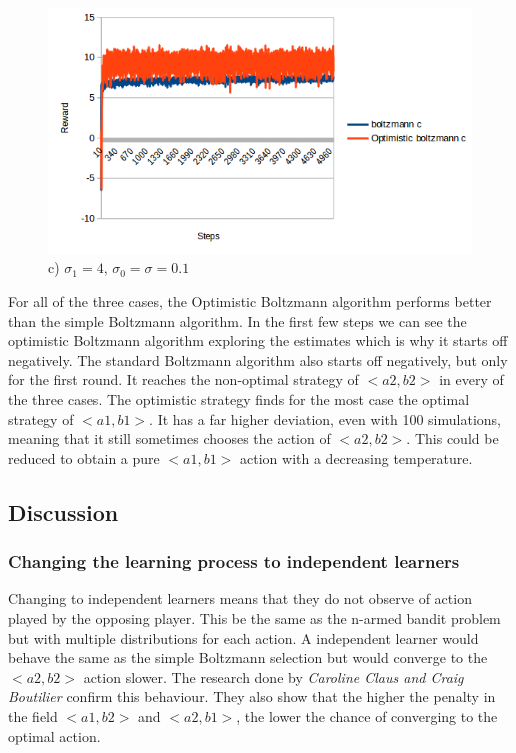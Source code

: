 \documentclass[a4paper, 11pt]{article}
\begin{document}
\begin{figure}[H]
	\centering
	\caption{c) $\sigma_1 = 4$, $\sigma_0 = \sigma = 0.1$}
    \includegraphics[width=1\linewidth]{ex2_c}
\end{figure}

For all of the three cases, the Optimistic Boltzmann algorithm performs better than the simple Boltzmann algorithm. In the first few steps we can see the optimistic Boltzmann algorithm exploring the estimates which is why it starts off negatively. The standard Boltzmann algorithm also starts off negatively, but only for the first round. It reaches the non-optimal strategy of $<a2,b2>$ in every of the three cases. The optimistic strategy finds for the most case the optimal strategy of $<a1,b1>$. It has a far higher deviation, even with 100 simulations, meaning that it still sometimes chooses the action of $<a2,b2>$. This could be reduced to obtain a pure $<a1,b1>$ action with a decreasing temperature.


\subsection{Discussion}

\subsubsection{Changing the learning process to independent learners}

Changing to independent learners means that they do not observe of action played by the opposing player. This be the same as the n-armed bandit problem but with multiple distributions for each action. A independent learner would behave the same as the simple Boltzmann selection but would converge to the $<a2,b2>$ action slower. The research done by \textit{Caroline Claus and Craig Boutilier}\cite{Claus:1998:DRL:295240.295800} confirm this behaviour. They also show that the higher the penalty in the field $<a1,b2>$ and $<a2,b1>$, the lower the chance of converging to the optimal action. 
\end{document}

